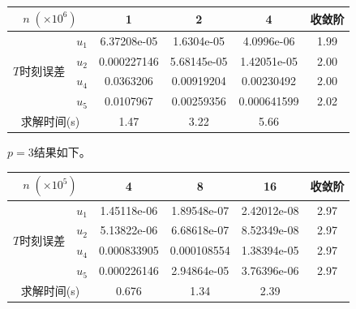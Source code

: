 \documentclass[lang=cn,10pt,bibend=bibtex]{elegantbook}
\begin{document}
\vspace{-.5em}
\begin{table}[H]
  \centering
  \renewcommand\arraystretch{0.8}
  \begin{tabular}{cc|ccc|c}
  \multicolumn{2}{c|}{$n\;(\times 10^6)$}                  & 1 & 2 & 4  & 收敛阶 \\ \hline
  \multicolumn{1}{c|}{\multirow{4}{*}{$T$时刻误差}} & \multicolumn{1}{c|}{$u_1$} &  6.37208e-05  &  1.6304e-05  & 4.0996e-06    &  1.99   \\
  \multicolumn{1}{c|}{}                         & \multicolumn{1}{c|}{$u_2$} &   0.000227146    & 5.68145e-05  & 1.42051e-05    &  2.00   \\
  \multicolumn{1}{c|}{}                         & \multicolumn{1}{c|}{$u_4$} &   0.0363206    & 0.00919204  & 0.00230492     &  2.00   \\
  \multicolumn{1}{c|}{}                         & \multicolumn{1}{c|}{$u_5$} &   0.0107967    & 0.00259356  & 0.000641599     &  2.02  \\ \hline
  \multicolumn{2}{c|}{求解时间(s)} & 1.47 & 3.22 & 5.66 & 
  \end{tabular}
\end{table}
\vspace{-.8em}

$p=3$结果如下。

\vspace{-.5em}
\begin{table}[H]
  \centering
  \renewcommand\arraystretch{0.8}
  \begin{tabular}{cc|ccc|c}
  \multicolumn{2}{c|}{$n\;(\times 10^5)$}                  & 4 & 8 & 16  & 收敛阶 \\ \hline
  \multicolumn{1}{c|}{\multirow{4}{*}{$T$时刻误差}} & \multicolumn{1}{c|}{$u_1$} &  1.45118e-06  &  1.89548e-07  & 2.42012e-08    &  2.97   \\
  \multicolumn{1}{c|}{}                         & \multicolumn{1}{c|}{$u_2$} &   5.13822e-06    & 6.68618e-07  & 8.52349e-08    &  2.97   \\
  \multicolumn{1}{c|}{}                         & \multicolumn{1}{c|}{$u_4$} &   0.000833905    & 0.000108554  & 1.38394e-05     &  2.97   \\
  \multicolumn{1}{c|}{}                         & \multicolumn{1}{c|}{$u_5$} &   0.000226146   & 2.94864e-05  & 3.76396e-06     &  2.97  \\ \hline
  \multicolumn{2}{c|}{求解时间(s)} & 0.676 & 1.34 & 2.39 & 
  \end{tabular}
\end{table}
\vspace{-.8em}
\end{document}
